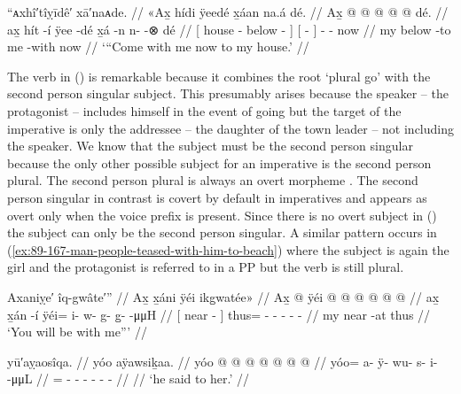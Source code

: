 \ex\label{ex:89-162-come-home-with-me}%
%
\begingl
	\glpreamble	“ᴀxhî′tîỵīdê′ xā′naᴀde. //
	\glpreamble	«\!Ax̱ hídi ÿeedé x̱áan na.á dé. //
	\gla	{} Ax̱  {}  @ {} {}
		{}  @ {} {} 
		 @ {} @ {} @ {} dé. //
	\glb	{} ax̱ hít -í ÿee -dé {}
		{} x̱á -n {}
		n- {}  -⊗ dé //
	\glc	{}[  house - below - {}]
		{}[  - {}]
		- \·  -
		now //
	\gld	{} my  {} below -to {}
		{} me -with {}
		 {} {} {} now //
	\glft	‘“Come with me now to my house.’
		//
\endgl
\xe

The verb in (\lastx) is remarkable because it combines the root  ‘plural go’ with the second person singular subject.
This presumably arises because the speaker – the protagonist – includes himself in the event of going but the target of the imperative is only the addressee – the daughter of the town leader – not including the speaker.
We know that the subject must be the second person singular because the only other possible subject for an imperative is the second person plural.
The second person plural is always an overt morpheme .
The second person singular in contrast is covert by default in imperatives and appears as overt  only when the  voice prefix is present.
Since there is no overt subject in (\lastx) the subject can only be the second person singular.
A similar pattern occurs in (\ref{ex:89-167-man-people-teased-with-him-to-beach}) where the subject is again the girl and the protagonist is referred to in a PP but the verb is still plural.

\ex\label{ex:89-163-youre-gonna-be-with-me}%
%
\begingl
	\glpreamble	Axaniỵe′ îq-gwâte′” //
	\glpreamble	Ax̱ x̱áni ÿéi ikg̱watée\!» //
	\gla	{} Ax̱  @ {} {}
			ÿéi @  @ {} @ {} @ {} @ {} @ {} //
	\glb	{} ax̱ x̱án -í {}
			ÿéi= i- w- g- g̱-  -μμH //
	\glc	{}[  near - {}]
			thus= - - - -  - //
	\gld	{} my near -at {}
			thus  {} {} {} {} {} //
	\glft	‘You will be with me”’
		//
\endgl
\xe

\ex\label{ex:89-164-he said}%
%
\begingl
	\glpreamble	yū′aỵaosîqa. //
	\glpreamble	yóo aÿawsiḵaa. //
	\gla	yóo @  @ {} @ {} @ {} @ {} @ {} @ {} //
	\glb	yóo= a- ÿ- wu- s- i-  -μμL //
	\glc	{}= - - - - -  - //
	\gld	{}  {} {} {} {} {} {} //
	\glft	‘he said to her.’
		//
\endgl
\xe


